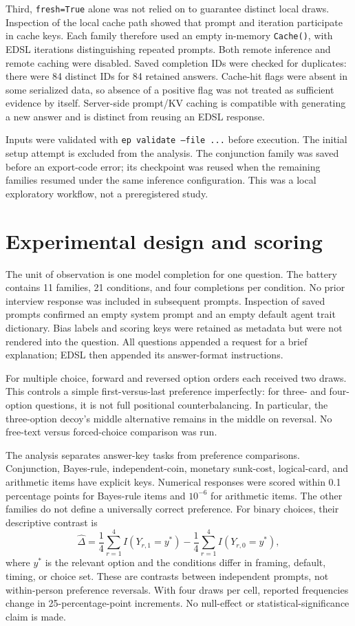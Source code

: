 \documentclass[11pt,letterpaper]{article}
\begin{document}
Third, \texttt{fresh=True} alone was not relied on to guarantee distinct local
draws. Inspection of the local cache path showed that prompt and iteration
participate in cache keys. Each family therefore used an empty in-memory
\texttt{Cache()}, with EDSL iterations distinguishing repeated prompts.
Both remote inference and remote caching were disabled. Saved completion IDs
were checked for duplicates: there were 84 distinct IDs for 84 retained answers.
Cache-hit flags were absent in some serialized data, so absence of a positive
flag was not treated as sufficient evidence by itself. Server-side prompt/KV
caching is compatible with generating a new answer and is distinct from
reusing an EDSL response.

Inputs were validated with \texttt{ep validate --file ...} before execution.
The initial setup attempt is excluded from the analysis. The conjunction
family was saved before an export-code error; its checkpoint was reused when
the remaining families resumed under the same inference configuration.
This was a local exploratory workflow, not a preregistered study.

\section{Experimental design and scoring}
The unit of observation is one model completion for one question. The battery
contains 11 families, 21 conditions, and four completions per condition.
No prior interview response was included in subsequent prompts. Inspection of
saved prompts confirmed an empty system prompt and an empty default agent
trait dictionary. Bias labels and scoring keys were retained as metadata but
were not rendered into the question. All questions appended a request for a
brief explanation; EDSL then appended its answer-format instructions.

For multiple choice, forward and reversed option orders each received two
draws. This controls a simple first-versus-last preference imperfectly: for
three- and four-option questions, it is not full positional counterbalancing.
In particular, the three-option decoy's middle alternative remains in the
middle on reversal. No free-text versus forced-choice comparison was run.

The analysis separates answer-key tasks from preference comparisons.
Conjunction, Bayes-rule, independent-coin, monetary sunk-cost, logical-card,
and arithmetic items have explicit keys. Numerical responses were scored
within 0.1 percentage points for Bayes-rule items and $10^{-6}$ for arithmetic
items. The other families do not define a universally correct preference.
For binary choices, their descriptive contrast is
\[
 \widehat{\Delta}=\frac{1}{4}\sum_{r=1}^{4}I(Y_{r,1}=y^*)
 -\frac{1}{4}\sum_{r=1}^{4}I(Y_{r,0}=y^*),
\]
where $y^*$ is the relevant option and the conditions differ in framing,
default, timing, or choice set. These are contrasts between independent
prompts, not within-person preference reversals. With four draws per cell,
reported frequencies change in 25-percentage-point increments. No null-effect
or statistical-significance claim is made.
\end{document}
